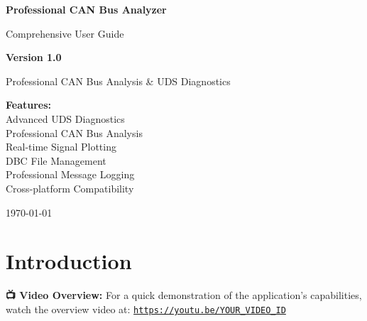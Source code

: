 \documentclass[11pt,a4paper]{article}
\begin{document}
\begin{titlepage}
    \centering
    \vspace*{2cm}
    
    {\Huge\textcolor{canblue}{\textbf{Professional CAN Bus Analyzer}}\par}
    \vspace{0.5cm}
    {\Large\textcolor{cangray}{Comprehensive User Guide}\par}
    \vspace{1.5cm}
    
    \begin{figure}[h]
        \centering
        \textcolor{canblue}{} \quad 
        \textcolor{cangreen}{} \quad 
        \textcolor{canred}{}
    \end{figure}
    
    \vspace{2cm}
    {\Large\textbf{Version 1.0}\par}
    \vspace{0.5cm}
    {\large Professional CAN Bus Analysis \& UDS Diagnostics\par}
    
    \vfill
    
    {\large\textcolor{cangray}{
    \textbf{Features:}\\
     Advanced UDS Diagnostics\\
     Professional CAN Bus Analysis\\
     Real-time Signal Plotting\\
     DBC File Management\\
     Professional Message Logging\\
     Cross-platform Compatibility
    }\par}
    
    \vspace{1cm}
    {\large \today\par}
\end{titlepage}

\tableofcontents
\newpage

\section{Introduction}

\textbf{📺 Video Overview:} For a quick demonstration of the application's capabilities, watch the overview video at: \href{https://youtu.be/YOUR_VIDEO_ID}{\texttt{https://youtu.be/YOUR\_VIDEO\_ID}}
\end{document}
